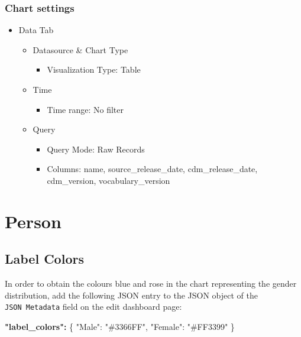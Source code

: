 \documentclass[
]{book}
\newenvironment{Shaded}{\begin{snugshade}}{\end{snugshade}}
\newcommand{\DataTypeTok}[1]{\textcolor[rgb]{0.13,0.29,0.53}{#1}}
\newcommand{\ErrorTok}[1]{\textcolor[rgb]{0.64,0.00,0.00}{\textbf{#1}}}
\newcommand{\FunctionTok}[1]{\textcolor[rgb]{0.00,0.00,0.00}{#1}}
\newcommand{\StringTok}[1]{\textcolor[rgb]{0.31,0.60,0.02}{#1}}
\providecommand{\tightlist}{%
  \setlength{\itemsep}{0pt}\setlength{\parskip}{0pt}}
\begin{document}
\hypertarget{chart-settings-6}{%
\subsection{Chart settings}\label{chart-settings-6}}

\begin{itemize}
\item
  Data Tab

  \begin{itemize}
  \item
    Datasource \& Chart Type

    \begin{itemize}
    \tightlist
    \item
      Visualization Type: Table
    \end{itemize}
  \item
    Time

    \begin{itemize}
    \tightlist
    \item
      Time range: No filter
    \end{itemize}
  \item
    Query

    \begin{itemize}
    \item
      Query Mode: Raw Records
    \item
      Columns: name, source\_release\_date, cdm\_release\_date, cdm\_version, vocabulary\_version
    \end{itemize}
  \end{itemize}
\end{itemize}

\hypertarget{person}{%
\chapter{Person}\label{person}}

\hypertarget{label-colors}{%
\section{Label Colors}\label{label-colors}}

In order to obtain the colours blue and rose in the chart representing the gender distribution,
add the following JSON entry to the JSON object of the \texttt{JSON\ Metadata} field on the edit dashboard page:

\begin{Shaded}
\begin{Highlighting}[]
\ErrorTok{"label\_colors":} \FunctionTok{\{}
    \DataTypeTok{"Male"}\FunctionTok{:} \StringTok{"\#3366FF"}\FunctionTok{,} 
    \DataTypeTok{"Female"}\FunctionTok{:} \StringTok{"\#FF3399"}
\FunctionTok{\}}
\end{Highlighting}
\end{Shaded}
\end{document}

